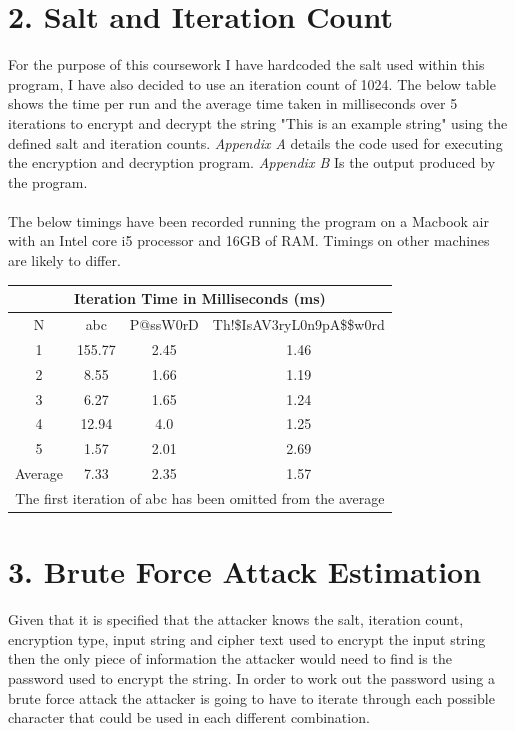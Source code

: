 \documentclass[a4paper, twoside, 11pt]{article}
\begin{document}
\section*{2. Salt and Iteration Count}
For the purpose of this coursework I have hardcoded the salt used within this program, 
I have also decided to use an iteration count of 1024. The below table shows the time per run and the average time
 taken in milliseconds over 5 iterations to encrypt and decrypt the string "This is an example string" using the 
 defined salt and iteration counts. \textit{Appendix A} details the code used for executing the encryption and decryption program.
 \textit{Appendix B} Is the output produced by the program.
 \\
 \\
 The below timings have been recorded running the program on a Macbook air with an Intel core i5 processor and 16GB of RAM.
  Timings on other machines are likely to differ.
 \begin{center}
	\begin{tabular}{ |c|c|c|c| } 
	 \hline
	 \multicolumn{4}{|c|}{Iteration Time in Milliseconds (ms)} \\
	 \hline
	 N & abc & P@ssW0rD & Th!\$IsAV3ryL0n9pA\$\$w0rd \\
	 \hline
	 1 & 155.77 & 2.45 & 1.46 \\ 
	 2 & 8.55 & 1.66 & 1.19  \\ 
	 3 & 6.27 & 1.65 & 1.24  \\ 
	 4 & 12.94 & 4.0 & 1.25 \\
	 5 & 1.57 & 2.01 & 2.69  \\
	 \hline
	 \hline
	 Average & 7.33 & 2.35 & 1.57  \\
	 \hline
	 \multicolumn{4}{|c|}{The first iteration of abc has been omitted from the average} \\
	 \hline
	\end{tabular}
\end{center}

\section*{3. Brute Force Attack Estimation}
Given that it is specified that the attacker knows the salt, iteration count, encryption type, 
input string and cipher text used to encrypt the input string then the only piece of information 
the attacker would need to find is the password used to encrypt the string. 
In order to work out the password using a brute force attack the attacker is going to have to 
iterate through each possible character that could be used in each different combination.
\end{document}
